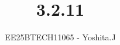 \documentclass[journal]{IEEEtran}
\begin{document}

\vspace{3cm}

\title{3.2.11}
\author{EE25BTECH11065 - Yoshita.J}
{\let\newpage\relax\maketitle}

\renewcommand{\thefigure}{\theenumi}
\renewcommand{\thetable}{\theenumi}
\setlength{\intextsep}{10pt} %


\renewcommand{\thetable}{\theenumi}
\end{document}
